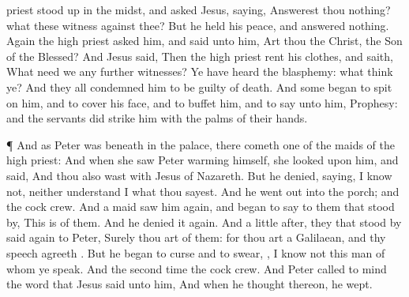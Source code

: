 {priest stood
up
in the
midst, and
asked
Jesus,
saying, Answerest
thou
nothing?
what
{}
these witness
against
thee?
But he held his
peace,
and
answered
nothing.
Again the high
priest
asked
him,
and
said unto
him,
Art
thou the
Christ, the
Son of the
Blessed?
And
Jesus
said,
{}
Then the high
priest
rent
his
clothes, and
saith,
What
need we
any
further
witnesses?
Ye have
heard the
blasphemy:
what
think
ye?
And
they
all
condemned
him to
be guilty
of
death.
And
some
began to
spit on
him,
and to
cover
his
face,
and to
buffet
him,
and to
say unto
him,
Prophesy:
and the
servants did
strike
him with the palms of their
hands.
\par }{\PP {}¶
And as
Peter
was
beneath
in the
palace, there
cometh
one of the
maids of the high
priest:
And when she
saw
Peter warming
himself, she
looked upon
him, and
said,
And thou
also
wast
with
Jesus of
Nazareth.
But he
denied,
saying, I
know
not,
neither understand
I
what
thou
sayest.
And he
went
out
into the
porch;
and the
cock
crew.
And a
maid
saw
him
again, and
began to
say to them
that stood
by,
This
is
{}
of
them.
And he denied
it
again.
And a
little
after, they
that stood
by
said
again to
Peter,
Surely thou
art
{}
of
them:
for thou
art a
Galilaean,
and
thy
speech
agreeth
{}.
But he
began to
curse
and to
swear,
{}, I
know
not
this
man of
whom ye
speak.
And the second
time the
cock
crew.
And
Peter called to
mind the
word
that
Jesus
said unto
him,
{}
And when he thought
thereon, he
wept.

}
